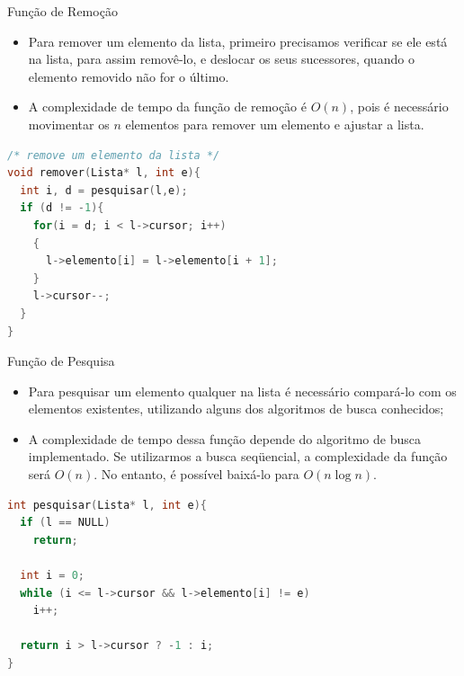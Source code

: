 \begin{frame}[fragile,c]{Função de Remoção} 
	\begin{itemize}
		\item Para remover um elemento da lista, primeiro precisamos verificar se ele está na lista, para assim removê-lo, e deslocar os seus sucessores, quando o elemento removido não for o último.
		\item A complexidade de tempo da função de remoção é $O(n)$, pois é necessário movimentar os $n$ elementos para remover um elemento e ajustar a lista.
	\end{itemize}
	
\footnotesize
\begin{lstlisting}[language=C]
/* remove um elemento da lista */
void remover(Lista* l, int e){     
  int i, d = pesquisar(l,e);
  if (d != -1){
    for(i = d; i < l->cursor; i++)
    {
      l->elemento[i] = l->elemento[i + 1];
    }
    l->cursor--;
  }  
}
\end{lstlisting}	
\end{frame} 

\begin{frame}[fragile]{Função de Pesquisa} 
   \begin{itemize}
	\item Para pesquisar um elemento qualquer na lista é necessário compará-lo com os elementos existentes, utilizando alguns dos algoritmos de busca conhecidos;
	\item A complexidade de tempo dessa função depende do algoritmo de busca implementado. Se utilizarmos a busca seqüencial, a complexidade da função será $O(n)$. No entanto, é possível baixá-lo para $O(n\log n)$.
 \end{itemize}

\footnotesize
\begin{lstlisting}[language=C]
int pesquisar(Lista* l, int e){
  if (l == NULL)
    return;
  
  int i = 0;
  while (i <= l->cursor && l->elemento[i] != e)
    i++;
        
  return i > l->cursor ? -1 : i;
}
\end{lstlisting}
\end{frame}

